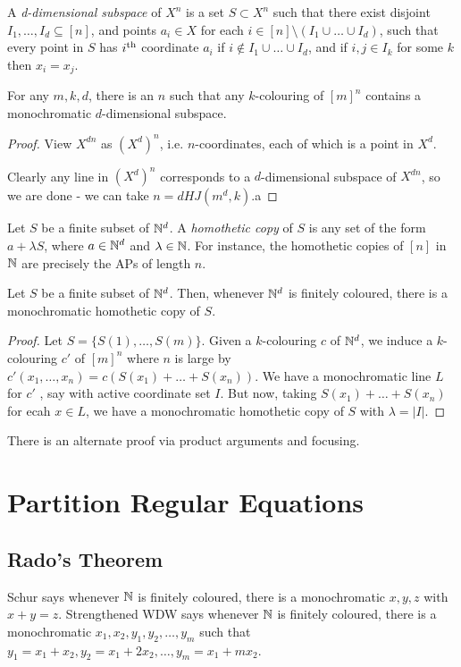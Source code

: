 \documentclass[10pt,a4paper]{article}
\begin{document}
A \emph{d-dimensional subspace} of $X^n$ is a set $S \subset X^n$ such that there exist disjoint $I_1, \ldots, I_d \subseteq [n]$, and points $a_i \in X$ for each $i \in [n]\setminus(I_1\cup\ldots\cup I_d)$, such that every point in $S$ has $i\textsuperscript{th}$ coordinate $a_i$ if $i \notin I_1\cup\ldots\cup I_d$, and if $i,j \in I_k$ for some $k$ then $x_i=x_j$.
\begin{theorem}
  For any $m,k,d$, there is an $n$ such that any $k$-colouring of $[m]^n$ contains a monochromatic $d$-dimensional subspace.
\end{theorem}
\begin{proof}
  View $X^{dn}$ as $(X^d)^n$, i.e. $n$-coordinates, each of which is a point in $X^d$.

  Clearly any line in $(X^d)^n$ corresponds to a $d$-dimensional subspace of $X^{dn}$, so we are done -  we can take $n=dHJ(m^d,k)$.a
\end{proof}
Let $S$ be a finite subset of $\mathbb{N}^d$. A \emph{homothetic copy} of $S$ is any set of the form $a+\lambda S$, where $a \in \mathbb{N}^d$ and $\lambda \in \mathbb{N}$. For instance, the homothetic copies of $[n]$ in $\mathbb{N}$ are precisely the APs of length $n$.
\begin{theorem}
  Let $S$ be a finite subset of $\mathbb{N}^d$. Then, whenever $\mathbb{N}^d$ is finitely coloured, there is a monochromatic homothetic copy of $S$.
\end{theorem}
\begin{proof}
  Let $S = \{S(1), \ldots, S(m)\}$. Given a $k$-colouring $c$ of $\mathbb{N}^d$, we induce a $k$-colouring $c'$ of $[m]^n$ where $n$ is large by $c'(x_1, \ldots, x_n) = c(S(x_1)+\ldots +S(x_n))$. We have a monochromatic line $L$ for $c'$ , say with active coordinate set $I$. But now, taking $S(x_1)+\ldots +S(x_n)$ for ecah $x \in L$, we have a monochromatic homothetic copy of $S$ with $\lambda = |I|$.
\end{proof}
There is an alternate proof via product arguments and focusing.

\section{Partition Regular Equations}
\subsection{Rado's Theorem}
Schur says whenever $\mathbb{N}$ is finitely coloured, there is a monochromatic $x,y,z$ with $x+y=z$. Strengthened WDW says whenever $\mathbb{N}$ is finitely coloured, there is a monochromatic $x_1, x_2, y_1, y_2, \ldots, y_m$ such that $y_1=x_1+x_2, y_2=x_1+2x_2, \ldots, y_m = x_1+mx_2$.
\end{document}
